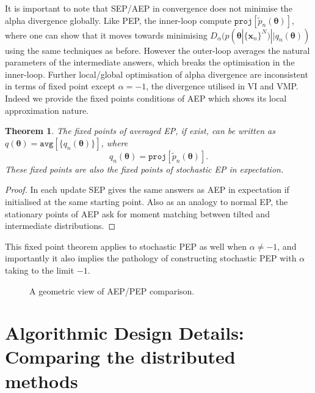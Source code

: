 \documentclass{article} %
\newtheorem{theorem}{Theorem}
\begin{document}
It is important to note that SEP/AEP in convergence does not minimise the alpha divergence globally. Like PEP, the inner-loop compute $\mathtt{proj}[\tilde{p}_n(\bm{\theta})]$, where one can show that it moves towards minimising $D_{\alpha}(p(\bm{\theta} | \{\bm{x}_n\}^N) || q_n(\bm{\theta}))$ using the same techniques as before. However the outer-loop averages the natural parameters of the intermediate answers, which breaks the optimisation in the inner-loop. Further local/global optimisation of alpha divergence are inconsistent in terms of fixed point except $\alpha = -1$, the divergence utilised in VI and VMP. Indeed we provide the fixed points conditions of AEP which shows its local approximation nature.
%
\begin{theorem}
The fixed points of averaged EP, if exist, can be written as $q(\bm{\theta}) = \mathtt{avg}[\{q_n(\bm{\theta})\}]$, where
\begin{equation}
q_n(\bm{\theta}) = \mathtt{proj}[\tilde{p}_n(\bm{\theta})].
\label{eq:mm}
\end{equation}
These fixed points are also the fixed points of stochastic EP in expectation. 
\end{theorem}
\begin{proof}
In each update SEP gives the same answers as AEP in expectation if initialised at the same starting point. Also as an analogy to normal EP, the stationary points of AEP ask for moment matching between tilted and intermediate distributions. 
\end{proof}
%
This fixed point theorem applies to stochastic PEP as well when $\alpha \neq -1$, and importantly it also implies the pathology of constructing stochastic PEP with $\alpha$ taking to the limit $-1$. 

\begin{figure}
\centering
\def\svgwidth{0.35\linewidth}
\subfigure[\label{fig:aep_vs_pep}]{
}
%
\caption{A geometric view of AEP/PEP comparison.}
\end{figure}

\section{Algorithmic Design Details: Comparing the distributed methods}
\end{document}
